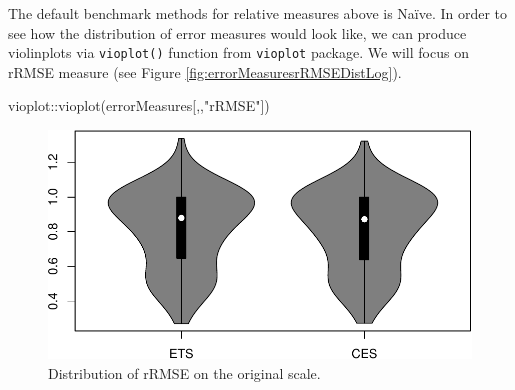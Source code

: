 \documentclass[
]{book}
\newenvironment{Shaded}{\begin{snugshade}}{\end{snugshade}}
\newcommand{\AttributeTok}[1]{\textcolor[rgb]{0.77,0.63,0.00}{#1}}
\newcommand{\CommentTok}[1]{\textcolor[rgb]{0.56,0.35,0.01}{\textit{#1}}}
\newcommand{\ConstantTok}[1]{\textcolor[rgb]{0.00,0.00,0.00}{#1}}
\newcommand{\DecValTok}[1]{\textcolor[rgb]{0.00,0.00,0.81}{#1}}
\newcommand{\FunctionTok}[1]{\textcolor[rgb]{0.00,0.00,0.00}{#1}}
\newcommand{\NormalTok}[1]{#1}
\newcommand{\OtherTok}[1]{\textcolor[rgb]{0.56,0.35,0.01}{#1}}
\newcommand{\SpecialCharTok}[1]{\textcolor[rgb]{0.00,0.00,0.00}{#1}}
\newcommand{\StringTok}[1]{\textcolor[rgb]{0.31,0.60,0.02}{#1}}
\theoremstyle{definition}
\theoremstyle{definition}
\theoremstyle{definition}
\theoremstyle{definition}
\theoremstyle{remark}
\begin{document}
\begin{Shaded}
\end{Shaded}

The default benchmark methods for relative measures above is Naïve. In order to see how the distribution of error measures would look like, we can produce violinplots via \texttt{vioplot()} function from \texttt{vioplot} package. We will focus on rRMSE measure (see Figure \ref{fig:errorMeasuresrRMSEDistLog}).

\begin{Shaded}
\begin{Highlighting}[]
\NormalTok{vioplot}\SpecialCharTok{::}\FunctionTok{vioplot}\NormalTok{(errorMeasures[,,}\StringTok{"rRMSE"}\NormalTok{])}
\end{Highlighting}
\end{Shaded}

\begin{figure}
\centering
\includegraphics{adam_files/figure-latex/errorMeasuresrRMSEDist-1.pdf}
\caption{\label{fig:errorMeasuresrRMSEDist}Distribution of rRMSE on the original scale.}
\end{figure}
\end{document}
